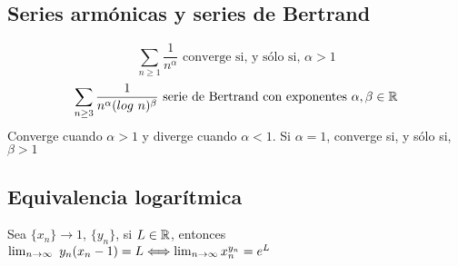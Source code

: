 \subsection{Series armónicas y series de Bertrand}
$$ \sum_{n\geq 1} \frac{1}{n^{\alpha}} \text{ converge si, y sólo si, } \alpha>1 $$
$$ \sum_{n\geq 3} \frac{1}{n^{\alpha}(log\ n)^{\beta}} \text{ serie de Bertrand con exponentes }\alpha,\beta\in\R $$
Converge cuando $\alpha>1$ y diverge cuando $\alpha<1$. Si $\alpha = 1$, converge si, y sólo si, $\beta>1$

\subsection{Equivalencia logarítmica}
Sea $\{x_n\}\rightarrow 1$, $\{y_n\}$, si $L\in\mathbb{R}$, entonces $\lim_{\substack{n\rightarrow\infty}} \ y_n(x_n-1) = L \Longleftrightarrow \lim_{\substack{n\rightarrow\infty}} x_n^{y_n} = e^L$